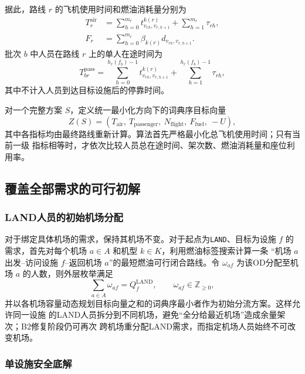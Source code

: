 \documentclass[UTF8,a4paper,zihao=5]{ctexart}
\begin{document}
据此，路线 $r$ 的飞机使用时间和燃油消耗量分别为
\begin{align}
  T_r^{\mathrm{air}}
  &=\sum_{h=0}^{m_r}t_{v_{rh},v_{r,h+1}}^{k(r)}
    +\sum_{h=1}^{m_r}\tau_{rh},
  \label{eq:q1-route-time}\\
  F_r
  &=\sum_{h=0}^{m_r}\beta_{k(r)}d_{v_{rh},v_{r,h+1}}.
  \label{eq:q1-route-fuel}
\end{align}
批次 $b$ 中人员在路线 $r$ 上的单人在途时间为
\begin{equation}
  T_{br}^{\mathrm{pass}}
  =\sum_{h=0}^{h_r(f_b)-1}t_{v_{rh},v_{r,h+1}}^{k(r)}
  +\sum_{h=1}^{h_r(f_b)-1}\tau_{rh},
  \label{eq:q1-passenger-time}
\end{equation}
其中不计入人员到达目标设施后的停靠时间。

对一个完整方案 $S$，定义统一最小化方向下的词典序目标向量
\begin{equation}
  Z(S)=\left(
  T_{\mathrm{air}},\
  T_{\mathrm{passenger}},\
  N_{\mathrm{flight}},\
  F_{\mathrm{fuel}},\
  -U
  \right),
  \label{eq:q1-objective}
\end{equation}
其中各指标均由最终路线重新计算。算法首先严格最小化总飞机使用时间；只有当前一级
指标相等时，才依次比较人员总在途时间、架次数、燃油消耗量和座位利用率。

\subsection{覆盖全部需求的可行初解}

\subsubsection{LAND人员的初始机场分配}

对于绑定具体机场的需求，保持其机场不变。对于起点为\texttt{LAND}、目标为设施 $f$
的需求，首先对每个机场 $a\in A$ 和机型 $k\in K$，利用燃油标签搜索计算一条
“机场 $a$ 出发--访问设施 $f$--返回机场 $a$”的最短燃油可行闭合路线。令
$\omega_{af}$ 为该OD分配至机场 $a$ 的人数，则外层枚举满足
\begin{equation}
  \sum_{a\in A}\omega_{af}=Q_f^{\mathrm{LAND}},\qquad
  \omega_{af}\in\mathbb Z_{\ge 0},
  \label{eq:q1-initial-airport}
\end{equation}
并以各机场容量动态规划目标向量之和的词典序最小者作为初始分流方案。这样允许同一设施
的LAND人员拆分到不同机场，避免“全分给最近机场”造成余量架次；B2修复阶段仍可再次
跨机场重分配LAND需求，而指定机场人员始终不可改变机场。

\subsubsection{单设施安全底解}
\end{document}
